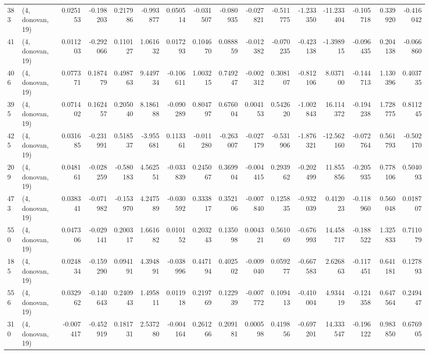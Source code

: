 \begin{tabular}{llrrrrrrrrrrrrrr}
383 &  (4, donovan, 19) &   0.025153 & -0.198203 &  0.217986 &   -0.993877 &  0.050514 &  -0.031507 & -0.080935 & -0.027821 & -0.511775 & -1.233350 &  -11.233404 & -0.105718 &  0.339920 & -0.416042 \\
41  &  (4, donovan, 19) &   0.011203 & -0.292066 &  0.110127 &    1.061632 &  0.017293 &   0.104670 &  0.088859 & -0.012382 & -0.070235 & -0.423138 &   -1.398915 & -0.096435 &  0.204138 & -0.066860 \\
406 &  (4, donovan, 19) &   0.077371 &  0.187479 &  0.498763 &    9.449734 & -0.106611 &   1.003215 &  0.749247 & -0.002312 &  0.308107 & -0.812106 &    8.037100 & -0.144713 &  1.130396 &  0.403735 \\
395 &  (4, donovan, 19) &   0.071402 &  0.162457 &  0.205040 &    8.186188 & -0.090289 &   0.804797 &  0.676004 &  0.004153 &  0.542620 & -1.002843 &   16.114372 & -0.194238 &  1.728775 &  0.811245 \\
425 &  (4, donovan, 19) &   0.031685 & -0.231991 &  0.518537 &   -3.955681 &  0.113361 &  -0.011280 & -0.263007 & -0.027179 & -0.531906 & -1.876321 &  -12.562160 & -0.072764 &  0.561793 & -0.502170 \\
209 &  (4, donovan, 19) &   0.048161 & -0.028259 & -0.580183 &    4.562551 & -0.033839 &   0.245067 &  0.369904 & -0.004415 &  0.293962 & -0.202499 &   11.855856 & -0.205935 &  0.778106 &  0.504093 \\
473 &  (4, donovan, 19) &   0.038341 & -0.071982 & -0.153970 &    4.247589 & -0.030592 &   0.333817 &  0.352106 & -0.007840 &  0.125835 & -0.932039 &    0.412023 & -0.118960 &  0.560048 &  0.018707 \\
550 &  (4, donovan, 19) &   0.047306 & -0.029141 &  0.200317 &    1.661682 &  0.010152 &   0.203243 &  0.135098 &  0.004321 &  0.561069 & -0.676993 &   14.458717 & -0.188522 &  1.325833 &  0.711079 \\
185 &  (4, donovan, 19) &   0.024834 & -0.159290 &  0.094191 &    4.394891 & -0.038996 &   0.447194 &  0.402502 & -0.009040 &  0.059277 & -0.667583 &    2.626863 & -0.117451 &  0.641181 &  0.127893 \\
556 &  (4, donovan, 19) &   0.032962 & -0.140643 &  0.240943 &    1.495811 &  0.011918 &   0.219769 &  0.122939 & -0.007772 &  0.109413 & -0.410004 &    4.934419 & -0.124358 &  0.647564 &  0.249447 \\
310 &  (4, donovan, 19) &  -0.007417 & -0.452919 &  0.181731 &    2.537280 & -0.004164 &   0.261266 &  0.209181 &  0.000598 &  0.419856 & -0.697201 &   14.333547 & -0.196122 &  0.983850 &  0.676905 \\

\end{tabular}
